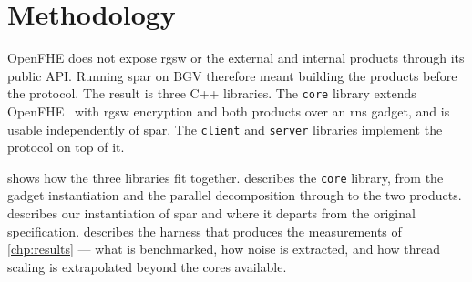 \chapter{Methodology}
\label{chp:methodology}



\newcommand{\corelib}{\texttt{core}}
\newcommand{\serverlib}{\texttt{server}}
\newcommand{\clientlib}{\texttt{client}}

\vfill
OpenFHE does not expose \gls{rgsw} or the external and internal products through its public API. Running \gls{spar} on BGV therefore meant building the products before the protocol. The result is three C++ libraries. The \corelib{} library extends OpenFHE~\cite{cryptoeprint:2022/915} with \gls{rgsw} encryption and both products over an \gls{rns} gadget, and is usable independently of \gls{spar}. The \clientlib{} and \serverlib{} libraries implement the protocol on top of it.

 shows how the three libraries fit together.  describes the \corelib{} library, from the gadget instantiation and the parallel decomposition through to the two products.  describes our instantiation of \gls{spar} and where it departs from the original specification.  describes the harness that produces the measurements of \cref{chp:results} --- what is benchmarked, how noise is extracted, and how thread scaling is extrapolated beyond the cores available.
\newpage




